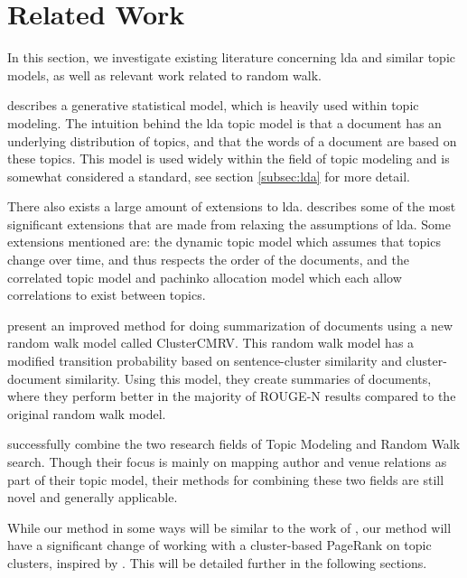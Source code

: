 \section{Related Work}\label{sec:related-works} 
In this section, we investigate existing literature concerning \gls{lda} and similar topic models, as well as relevant work related to random walk.

\citet{lda} describes a generative statistical model, which is heavily used within topic modeling. 
The intuition behind the \gls{lda} topic model is that a document has an underlying distribution of topics, and that the words of a document are based on these topics.
This model is used widely within the field of topic modeling and is somewhat considered a standard, see section \autoref{subsec:lda} for more detail.

There also exists a large amount of extensions to \gls{lda}.
\citet{blei2012topicmodels} describes some of the most significant extensions that are made from relaxing the assumptions of \gls{lda}.
Some extensions mentioned are: the dynamic topic model\cite{blei2006dynamic} which assumes that topics change over time, and thus respects the order of the documents, and the correlated topic model\cite{blei2007correlated} and pachinko allocation model\cite{li2006pachinko} which each allow correlations to exist between topics.

\citet{ClusterPageRank} present an improved method for doing summarization of documents using a new random walk model called ClusterCMRV. 
This random walk model has a modified transition probability based on sentence-cluster similarity and cluster-document similarity.
Using this model, they create summaries of documents, where they perform better in the majority of ROUGE-N results compared to the original random walk model.

\citet{Tang2008} successfully combine the two research fields of Topic Modeling and Random Walk search. Though their focus is mainly on mapping author and venue relations as part of their topic model, their methods for combining these two fields are still novel and generally applicable.

While our method in some ways will be similar to the work of \citeauthor{Tang2008}, our method will have a significant change of working with a cluster-based PageRank on topic clusters, inspired by \cite{ClusterPageRank}.
This will be detailed further in the following sections.


